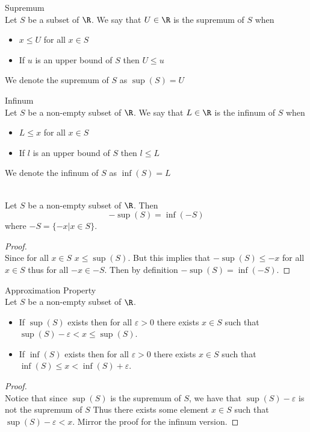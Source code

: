 \documentclass[a4paper]{article}
\begin{document}
\begin{defn}{Supremum}{}\\ Let $S$ be a subset of $\R$. We say that $U\in\R$ is the supremum of $S$ when
\begin{itemize}
\item $x\leq U$ for all $x\in S$
\item If $u$ is an upper bound of $S$ then $U\leq u$
\end{itemize}
We denote the supremum of $S$ as $\sup(S)=U$
\end{defn}

\begin{defn}{Infinum}{}\\ Let $S$ be a non-empty subset of $\R$. We say that $L\in\R$ is the infinum of $S$ when
\begin{itemize}
\item $L\leq x$ for all $x\in S$
\item If $l$ is an upper bound of $S$ then $l\leq L$
\end{itemize}
We denote the infinum of $S$ as $\inf(S)=L$
\end{defn}

\begin{prp}{}{}\\ Let $S$ be a non-empty subset of $\R$. Then $$-\sup(S)=\inf(-S)$$ where $-S=\{-x|x\in S\}$. 
\begin{proof}\\ Since for all $x\in S$ $x\leq\sup(S)$. But this implies that $-\sup(S)\leq-x$ for all $x\in S$ thus for all $-x\in-S$. Then by definition $-\sup(S)=\inf(-S)$. 
\end{proof}
\end{prp}

\begin{prp}{Approximation Property}{}\\ Let $S$ be a non-empty subset of $\R$. 
\begin{itemize}
\item If $\sup(S)$ exists then for all $\varepsilon>0$ there exists $x\in S$ such that $\sup(S)-\varepsilon<x\leq\sup(S)$. 
\item If $\inf(S)$ exists then for all $\varepsilon>0$ there exists $x\in S$ such that $\inf(S)\leq x<\inf(S)+\varepsilon$. 
\end{itemize}
\begin{proof}\\ Notice that since $\sup(S)$ is the supremum of $S$, we have that $\sup(S)-\varepsilon$ is not the supremum of $S$ Thus there exists some element $x\in S$ such that $\sup(S)-\varepsilon<x$. Mirror the proof for the infinum version. 
\end{proof}
\end{prp}
\end{document}
